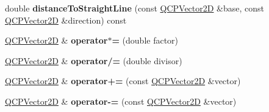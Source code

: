\begin{DoxyCompactItemize}
double {\bfseries distance\+To\+Straight\+Line} (const \hyperlink{class_q_c_p_vector2_d}{Q\+C\+P\+Vector2D} \&base, const \hyperlink{class_q_c_p_vector2_d}{Q\+C\+P\+Vector2D} \&direction) const
\item 
\mbox{\label{class_q_c_p_vector2_d_a40c5c7c1b3e613936e7cd2d0e132e0db}} 
\hyperlink{class_q_c_p_vector2_d}{Q\+C\+P\+Vector2D} \& {\bfseries operator$\ast$=} (double factor)
\item 
\mbox{\label{class_q_c_p_vector2_d_a1540d17102cb4e26d4af2c58c5ce6807}} 
\hyperlink{class_q_c_p_vector2_d}{Q\+C\+P\+Vector2D} \& {\bfseries operator/=} (double divisor)
\item 
\mbox{\label{class_q_c_p_vector2_d_a40549cdc8ecace36c241e949a6d8c1dc}} 
\hyperlink{class_q_c_p_vector2_d}{Q\+C\+P\+Vector2D} \& {\bfseries operator+=} (const \hyperlink{class_q_c_p_vector2_d}{Q\+C\+P\+Vector2D} \&vector)
\item 
\mbox{\label{class_q_c_p_vector2_d_a96e47599c085a1e7cee8088e0f7cae35}} 
\hyperlink{class_q_c_p_vector2_d}{Q\+C\+P\+Vector2D} \& {\bfseries operator-\/=} (const \hyperlink{class_q_c_p_vector2_d}{Q\+C\+P\+Vector2D} \&vector)
\end{DoxyCompactItemize}
